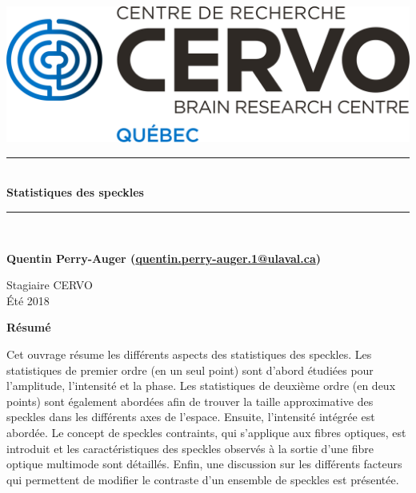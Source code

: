 \documentclass{article}       %
\newcommand{\HRule}{\rule{\linewidth}{0.5mm}}
\begin{document}

\begin{titlepage}  %
\begin{center}   %
\includegraphics[scale=0.5]{fig/logo.png}\\
\vspace{1cm}


\HRule\\[0.4cm]
{\large\bfseries Statistiques des speckles}
\HRule\\[1.75cm]


\vfill

{\bfseries Quentin Perry-Auger (\url{quentin.perry-auger.1@ulaval.ca})}

\vfill

Stagiaire CERVO\\ Été 2018


\vfill

\end{center}

\textbf{\Large Résumé}

Cet ouvrage résume les différents aspects des statistiques des speckles. Les statistiques de premier ordre (en un seul point) sont d'abord étudiées pour l'amplitude, l'intensité et la phase. Les statistiques de deuxième ordre (en deux points) sont également abordées afin de trouver la taille approximative des speckles dans les différents axes de l'espace. Ensuite, l'intensité intégrée est abordée. Le concept de speckles contraints, qui s'applique aux fibres optiques, est introduit et les caractéristiques des speckles observés à la sortie d'une fibre optique multimode sont détaillés. Enfin, une discussion sur les différents facteurs qui permettent de modifier le contraste d'un ensemble de speckles est présentée.

\end{titlepage}
\end{document}
